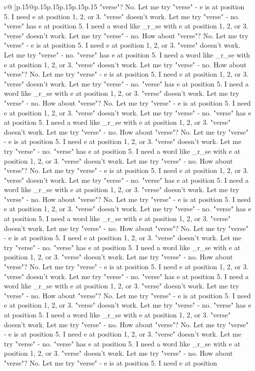 \documentclass{article}
\begin{document}
{\begin{supertabular}{c@{$\;$}|p{.15\linewidth}@{}p{.15\linewidth}p{.15\linewidth}p{.15\linewidth}p{.15\linewidth}p{.15\linewidth}}
{{{"verse"? No. Let me try "verse" {-} e is at position 5. I need e at position 1, 2, or 3. "verse" doesn't work. Let me try "verse" {-} no. "verse" has e at position 5. I need a word like \_r\_se with e at position 1, 2, or 3. "verse" doesn't work. Let me try "verse" {-} no. How about "verse"? No. Let me try "verse" {-} e is at position 5. I need e at position 1, 2, or 3. "verse" doesn't work. Let me try "verse" {-} no. "verse" has e at position 5. I need a word like \_r\_se with e at position 1, 2, or 3. "verse" doesn't work. Let me try "verse" {-} no. How about "verse"? No. Let me try "verse" {-} e is at position 5. I need e at position 1, 2, or 3. "verse" doesn't work. Let me try "verse" {-} no. "verse" has e at position 5. I need a word like \_r\_se with e at position 1, 2, or 3. "verse" doesn't work. Let me try "verse" {-} no. How about "verse"? No. Let me try "verse" {-} e is at position 5. I need e at position 1, 2, or 3. "verse" doesn't work. Let me try "verse" {-} no. "verse" has e at position 5. I need a word like \_r\_se with e at position 1, 2, or 3. "verse" doesn't work. Let me try "verse" {-} no. How about "verse"? No. Let me try "verse" {-} e is at position 5. I need e at position 1, 2, or 3. "verse" doesn't work. Let me try "verse" {-} no. "verse" has e at position 5. I need a word like \_r\_se with e at position 1, 2, or 3. "verse" doesn't work. Let me try "verse" {-} no. How about "verse"? No. Let me try "verse" {-} e is at position 5. I need e at position 1, 2, or 3. "verse" doesn't work. Let me try "verse" {-} no. "verse" has e at position 5. I need a word like \_r\_se with e at position 1, 2, or 3. "verse" doesn't work. Let me try "verse" {-} no. How about "verse"? No. Let me try "verse" {-} e is at position 5. I need e at position 1, 2, or 3. "verse" doesn't work. Let me try "verse" {-} no. "verse" has e at position 5. I need a word like \_r\_se with e at position 1, 2, or 3. "verse" doesn't work. Let me try "verse" {-} no. How about "verse"? No. Let me try "verse" {-} e is at position 5. I need e at position 1, 2, or 3. "verse" doesn't work. Let me try "verse" {-} no. "verse" has e at position 5. I need a word like \_r\_se with e at position 1, 2, or 3. "verse" doesn't work. Let me try "verse" {-} no. How about "verse"? No. Let me try "verse" {-} e is at position 5. I need e at position 1, 2, or 3. "verse" doesn't work. Let me try "verse" {-} no. "verse" has e at position 5. I need a word like \_r\_se with e at position 1, 2, or 3. "verse" doesn't work. Let me try "verse" {-} no. How about "verse"? No. Let me try "verse" {-} e is at position 5. I need e at position 1, 2, or 3. "verse" doesn't work. Let me try "verse" {-} no. "verse" has e at position 5. I need a word like \_r\_se with e at position 1, 2, or 3. "verse" doesn't work. Let me try "verse" {-} no. How about "verse"? No. Let me try "verse" {-} e is at position 5. I need e at position 1, 2, or 3. "verse" doesn't work. Let me try "verse" {-} no. "verse" has e at position 5. I need a word like \_r\_se with e at position 1, 2, or 3. "verse" doesn't work. Let me try "verse" {-} no. How about "verse"? No. Let me try "verse" {-} e is at position 5. I need e at position }}}
\end{supertabular}}
\end{document}
